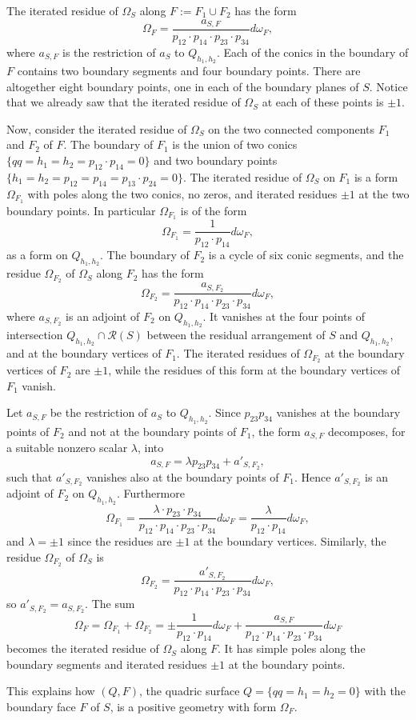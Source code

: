 \documentclass[12pt]{extarticle}
\theoremstyle{definition}
\newenvironment{example}
{\pushQED{\qed}\renewcommand{\qedsymbol}{$\diamond$}\examplex}
{\popQED\endexamplex}
\begin{document}
\begin{example}
 The iterated residue of $\Omega_S$ along $F:=F_1\cup F_2$ has the form $$\Omega_F=\frac{a_{S,F}}{p_{12}\cdot p_{14}\cdot p_{23}\cdot p_{34}}d\omega_F,$$
 where $a_{S,F}$ is the restriction of $a_S$ to $Q_{h_1,h_2}$.
Each of the conics in the boundary of $F$ contains two boundary segments and four boundary points. There are altogether eight boundary points, one in each of the boundary planes of $S$. Notice that we already saw that the iterated residue of $\Omega_S$ at each of these points is $\pm 1$.  

Now, consider the iterated residue of $\Omega_S$ on the two connected components $F_1$ and $F_2$ of $F$.  
 The boundary of $F_1$ is the union of two conics 
 $\{qq=h_1=h_2=p_{12}\cdot p_{14}=0\}$ and two boundary points $\{h_1=h_2=p_{12}= p_{14}=p_{13}\cdot p_{24}=0\}$.
 The iterated residue of $\Omega_S$ on $F_1$ is a form $\Omega_{F_1}$ with poles along the two conics, no zeros, and iterated residues $\pm 1$ at the two boundary points.
 In particular $\Omega_{F_1}$ is of the form
  $$\Omega_{F_1}=\frac{1}{p_{12}\cdot p_{14}}d\omega_F,$$
 as a form on $Q_{h_1,h_2}$. 
 The boundary of $F_2$ is a cycle of six conic segments, and the
 residue $\Omega_{F_2}$ of $\Omega_S$ along $F_2$ has the form $$\Omega_{F_2}=\frac{a_{S,F_2}}{p_{12}\cdot p_{14}\cdot p_{23}\cdot p_{34}}d\omega_F,$$
where $a_{S,F_2}$ is an adjoint of $F_2$ on $Q_{h_1,h_2}$. It vanishes at the four points of intersection $Q_{h_1,h_2}\cap\mathcal{R}(S)$ between the residual arrangement of $S$ and $Q_{h_1,h_2}$, and at the boundary vertices of $F_1$. The iterated residues of $\Omega_{F_2}$ at the boundary vertices of $F_2$ are $\pm 1$, while the residues of this form at the boundary vertices of $F_1$ vanish.  

Let $a_{S,F}$ be the restriction of $a_S$ to $Q_{h_1,h_2}$.  Since $p_{23}p_{34}$ vanishes at the boundary points of $F_2$ and not at the boundary points of $F_1$, the form $a_{S,F}$ decomposes, for a suitable nonzero scalar $\lambda$, into 
 $$a_{S,F}=\lambda p_{23}p_{34}+a'_{S,F_2},$$
 such that $a'_{S,F_2}$ vanishes also at the boundary points of $F_1$.  Hence $a'_{S,F_2}$
 is an adjoint of $F_2$ on $Q_{h_1,h_2}$. Furthermore $$\Omega_{F_1}=\frac{\lambda \cdot p_{23}\cdot p_{34}}{p_{12}\cdot p_{14}\cdot p_{23}\cdot p_{34}}d\omega_F=\frac{\lambda}{p_{12}\cdot p_{14}}d\omega_F,$$ and $\lambda=\pm 1$ since the residues are $\pm 1$ at the boundary vertices.  Similarly, the residue $\Omega_{F_2}$ of $\Omega_S$ is $$\Omega_{F_2}=\frac{a'_{S,F_2}}{p_{12}\cdot p_{14}\cdot p_{23}\cdot p_{34}}d\omega_F,$$
 so $a'_{S,F_2}=a_{S,F_2}.$
The sum  $$\Omega_F=\Omega_{F_1}+\Omega_{F_2}=\pm\frac{1}{p_{12}\cdot p_{14}}d\omega_F+\frac{a_{S,F}}{p_{12}\cdot p_{14}\cdot p_{23}\cdot p_{34}}d\omega_F$$
becomes the iterated residue of $\Omega_S$ along $F$. It has simple poles along the boundary segments and iterated residues $\pm 1$ at the boundary points.  

This explains how $(Q,F)$, the quadric surface $Q=\{qq=h_1=h_2=0\}$ with the boundary face $F$ of $S$, is a positive geometry with form $\Omega_F$.  
\end{example}
\end{document}
